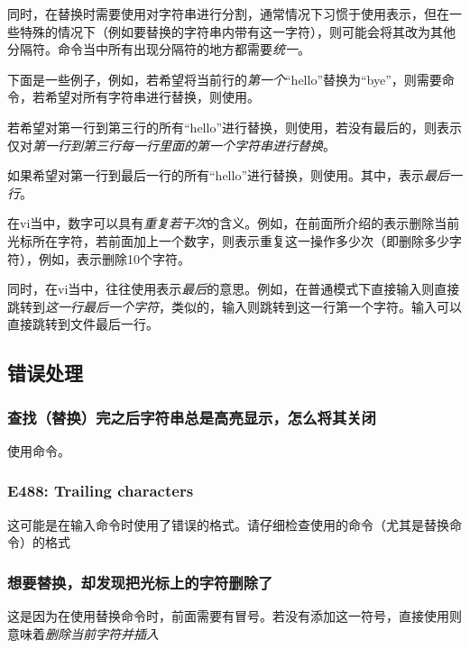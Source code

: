 同时，在替换时需要使用\code{[分隔符]}对字符串进行分割，通常情况下习惯于使用\code{/}表示，但在一些特殊的情况下（例如要替换的字符串内带有这一字符），则可能会将其改为其他分隔符。命令当中所有出现分隔符的地方都需要\emph{统一}。

下面是一些例子，例如，若希望将当前行的\emph{第一个}“hello”替换为“bye”，则需要命令，若希望对所有字符串进行替换，则使用。

若希望对第一行到第三行的所有“hello”进行替换，则使用，若没有最后的，则表示仅对\emph{第一行到第三行每一行里面的第一个字符串进行替换}。

如果希望对第一行到最后一行的所有“hello”进行替换，则使用。其中，表示\emph{最后一行}。

\begin{attention}
    在vi当中，数字可以具有\emph{重复若干次}的含义。例如，在前面所介绍的表示删除当前光标所在字符，若前面加上一个数字，则表示重复这一操作多少次（即删除多少字符），例如，表示删除10个字符。

    同时，在vi当中，往往使用\code{\$}表示\emph{最后}的意思。例如，在普通模式下直接输入\code{\$}则直接跳转到\emph{这一行最后一个字符}，类似的，输入则跳转到这一行第一个字符。输入\code{:\$}可以直接跳转到文件最后一行。
\end{attention}


\subsection{错误处理}\label{subsec:查找与替换-错误处理}

\subsubsection{查找（替换）完之后字符串总是高亮显示，怎么将其关闭}

使用命令。

\subsubsection{E488: Trailing characters}

这可能是在输入命令时使用了错误的格式。请仔细检查使用的命令（尤其是替换命令）的格式

\subsubsection{想要替换，却发现把光标上的字符删除了}

这是因为在使用替换命令时，前面需要有冒号\code{:}。若没有添加这一符号，直接使用则意味着\emph{删除当前字符并插入}